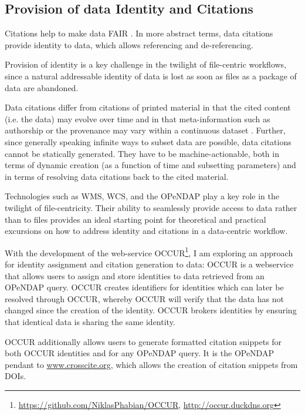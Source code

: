 \documentclass[letterpaper, parskip=half]{scrartcl}
\begin{document}
\newpage

\subsection{Provision of data Identity and Citations}
Citations help to make data \acrfull{FAIR} \citep{Wilkinson2016}. In more abstract terms, data citations provide identity to data, which allows referencing and de-referencing.

Provision of identity is a key challenge in the twilight of file-centric workflows, since a natural addressable identity of data is lost as soon as files as a package of data are abandoned.

Data citations differ from citations of printed material in that the cited content (i.e. the data) may evolve over time and in that meta-information such as authorship or the provenance may vary within a continuous dataset \citep{Buneman2016}. Further, since generally speaking infinite ways to subset data are possible, data citations cannot be statically generated. They have to be machine-actionable, both in terms of dynamic creation (as a function of time and subsetting parameters) and in terms of resolving data citations back to the cited material.

Technologies such as \gls{WMS}, \gls{WCS}, and the \gls{OPeNDAP} \citep{Gallagher2005} play a key role in the twilight of file-centricity. Their ability to seamlessly provide access to data rather than to files provides an ideal starting point for theoretical and practical excursions on how to address identity and citations in a data-centric workflow. 


With the development of the web-service \gls{OCCUR}\footnote{\url{https://github.com/NiklasPhabian/OCCUR}, \url{http://occur.duckdns.org}}, I am exploring an approach for identity assignment and citation generation to data:
\Gls{OCCUR} is a webservice that allows users to assign and store identities to data retrieved from an \gls{OPeNDAP} query. 
OCCUR creates identifiers for identities which can later be resolved through \gls{OCCUR}, whereby \gls{OCCUR} will verify that the data has not changed since the creation of the identity. OCCUR brokers identities by ensuring that identical data is sharing the same identity.

\gls{OCCUR} additionally allows users to generate formatted citation snippets for both OCCUR identities and for any \gls{OPeNDAP} query. It is the \gls{OPeNDAP} pendant to \url{www.crosscite.org}, which allows the creation of citation snippets from \glspl{DOI}. 
\end{document}

